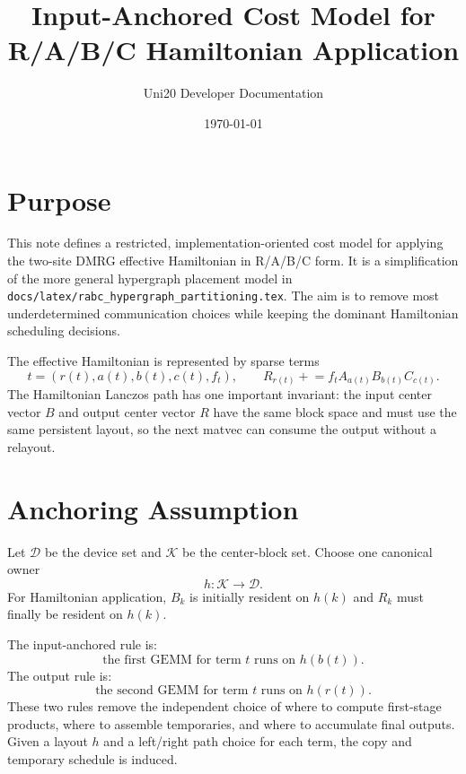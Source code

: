 \documentclass[11pt]{article}
\title{Input-Anchored Cost Model for R/A/B/C Hamiltonian Application}
\author{Uni20 Developer Documentation}
\date{\today}
\begin{document}
\maketitle

\section{Purpose}

This note defines a restricted, implementation-oriented cost model for applying
the two-site DMRG effective Hamiltonian in R/A/B/C form.  It is a simplification
of the more general hypergraph placement model in
\texttt{docs/latex/rabc\_hypergraph\_partitioning.tex}.  The aim is to remove
most underdetermined communication choices while keeping the dominant
Hamiltonian scheduling decisions.

The effective Hamiltonian is represented by sparse terms
\begin{equation}
  t = (r(t),a(t),b(t),c(t),f_t),
  \qquad
  R_{r(t)} \mathrel{+}= f_t A_{a(t)} B_{b(t)} C_{c(t)} .
\end{equation}
The Hamiltonian Lanczos path has one important invariant: the input center
vector $B$ and output center vector $R$ have the same block space and must use
the same persistent layout, so the next matvec can consume the output without a
relayout.

\section{Anchoring Assumption}

Let $\mathcal{D}$ be the device set and $\mathcal{K}$ be the center-block set.
Choose one canonical owner
\begin{equation}
  h : \mathcal{K} \to \mathcal{D}.
\end{equation}
For Hamiltonian application, $B_k$ is initially resident on $h(k)$ and $R_k$
must finally be resident on $h(k)$.

The input-anchored rule is:
\begin{equation}
  \text{the first GEMM for term } t \text{ runs on } h(b(t)).
\end{equation}
The output rule is:
\begin{equation}
  \text{the second GEMM for term } t \text{ runs on } h(r(t)).
\end{equation}
These two rules remove the independent choice of where to compute first-stage
products, where to assemble temporaries, and where to accumulate final outputs.
Given a layout $h$ and a left/right path choice for each term, the copy and
temporary schedule is induced.
\end{document}
